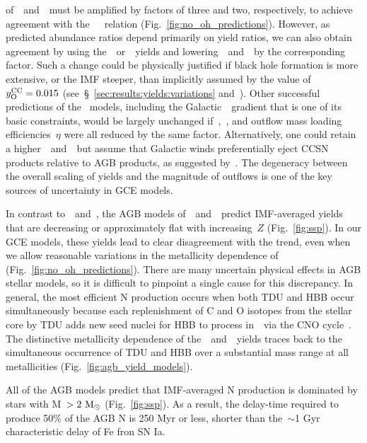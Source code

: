 \documentclass[ms.tex]{subfiles}
\begin{document}
of~\cristallo~and~\ventura~must be amplified by factors of three and two,
respectively, to achieve agreement with the~\citet{Dopita2016}~\ohno~relation
(Fig.~\ref{fig:no_oh_predictions}).
However, as predicted abundance ratios depend primarily on yield ratios, we can
also obtain agreement by using the~\cristallo~or~\ventura~yields and
lowering~~and~~by the corresponding factor.
Such a change could be physically justified if black hole formation is more
extensive, or the IMF steeper, than implicitly assumed by the value
of~$y_\text{O}^\text{CC} = 0.015$ (see~\S~\ref{sec:results:yields:variations}
and~\citealp{Griffith2021}).
Other successful predictions of the~\citet{Johnson2021} models, including the
Galactic~\oh~gradient that is one of its basic constraints, would be largely
unchanged if~,~, and outflow mass loading efficiencies~$\eta$
were all reduced by the same factor.
Alternatively, one could retain a higher~~and~~but assume that
Galactic winds preferentially eject CCSN products relative to AGB products, as
suggested by~\citet{Vincenzo2016a}.
The degeneracy between the overall scaling of yields and the magnitude of
outflows is one of the key sources of uncertainty in GCE models.
\par
In contrast to~\cristallo~and~\ventura, the AGB models
of~\karakasten~and~\karakas~predict IMF-averaged yields that are decreasing or
approximately flat with increasing~$Z$ (Fig.~\ref{fig:ssp}).
In our GCE models, these yields lead to clear disagreement with the
\citet{Dopita2016} trend, even when we allow reasonable variations in the
metallicity dependence of~ (Fig.~\ref{fig:no_oh_predictions}).
There are many uncertain physical effects in AGB stellar models, so it is
difficult to pinpoint a single cause for this discrepancy.
In general, the most efficient N production occurs when both TDU and HBB occur
simultaneously because each replenishment of C and O isotopes from the stellar
core by TDU adds new seed nuclei for HBB to process in~\Nfourteen~via the CNO
cycle~\citep{Ventura2013}.
The distinctive metallicity dependence of the~\karakasten~and~\karakas~yields
traces back to the simultaneous occurrence of TDU and HBB over a substantial
mass range at all metallicities (Fig.~\ref{fig:agb_yield_models}).
\par
All of the AGB models predict that IMF-averaged N production is dominated by
stars with M~$> 2~\text{M}_\odot$ (Fig.~\ref{fig:ssp}).
As a result, the delay-time required to produce 50\% of the AGB N is 250 Myr or
less, shorter than the~$\sim$1 Gyr characteristic delay of Fe fron SN Ia.
\end{document}
